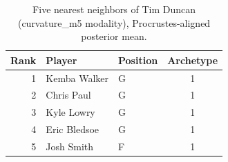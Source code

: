 \begin{table}[htbp]
  \centering\small
  \begin{tabular}{rllc}
    \toprule
    Rank & Player & Position & Archetype \\
    \midrule
    1 & Kemba Walker & G & 1 \\
    2 & Chris Paul & G & 1 \\
    3 & Kyle Lowry & G & 1 \\
    4 & Eric Bledsoe & G & 1 \\
    5 & Josh Smith & F & 1 \\
    \bottomrule
  \end{tabular}
  \caption{Five nearest neighbors of Tim Duncan (curvature_m5 modality), Procrustes-aligned posterior mean.}
  \label{tab:Tim_Duncan_neighbors_curvature_m5}
\end{table}

